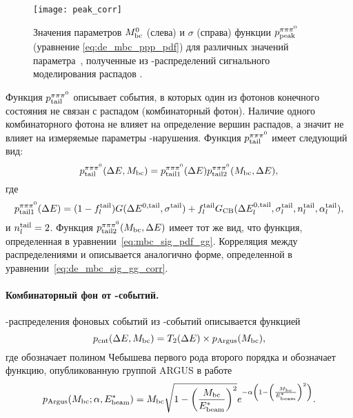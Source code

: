 \begin{figure}[htb]
 \centering
  \texttt{[image: peak\_corr]}\\
  \caption{Значения параметров $M_{\mathrm{bc}}^0$ (слева) и $\sigma$ (справа) функции $p{}_{\mathrm{peak}}^{\pi\pi\pi^0}$  (уравнение \eqref{eq:de_mbc_ppp_pdf}) для различных значений параметра~\de, полученные из \mbc-распределений сигнального моделирования распадов \bdomega.}
  \label{fig:sig_corr2}
\end{figure}

Функция $p{}_{\mathrm{tail}}^{\pi\pi\pi^0}$ описывает события, в которых один из фотонов конечного состояния не связан с распадом \brec (комбинаторный фотон).  Наличие одного комбинаторного фотона не влияет на определение вершин распадов, а значит не влияет на измеряемые параметры \cpconj-нарушения.  Функция $p{}_{\mathrm{tail}}^{\pi\pi\pi^0}$ имеет следующий вид:
\begin{equation}\label{eq:de_mbc_sig_ppp_tail}
 p{}_{\mathrm{tail}}^{\pi\pi\pi^0}(\Delta E,M_{\mathrm{bc}}) = p_{\mathrm{tail}1}^{\pi\pi\pi^0}(\Delta E)p_{\mathrm{tail}2}^{\pi\pi\pi^0}(M_{\mathrm{bc}},\Delta E),
\end{equation}
где
\begin{equation}\label{eq:de_sig_pdf_ppp_tail}
 p_{\mathrm{tail}1}^{\pi\pi\pi^0}(\Delta E) = (1-f^{\mathrm{tail}}_l)G(\Delta E^{0,\mathrm{tail}},\sigma^{\mathrm{tail}})+f^{\mathrm{tail}}_lG_{\textrm{CB}}(\Delta E^{0,\mathrm{tail}}_l,\sigma^{\mathrm{tail}}_l,n^{\mathrm{tail}}_l,\alpha^{\mathrm{tail}}_l),
\end{equation}
и $n^{\mathrm{tail}}_{l} = 2$.  Функция $p_{\mathrm{tail}2}^{\pi\pi\pi^0}(M_{\mathrm{bc}},\Delta E)$ имеет тот же вид, что функция, определенная в уравнении~\eqref{eq:mbc_sig_pdf_gg}.  Корреляция между распределениями \de и \mbc описывается аналогично форме, определенной в уравнении~\eqref{eq:de_mbc_sig_gg_corr}.

\paragraph{\boldmath Комбинаторный фон от \qqbar-событий.}
 \de-\mbc распределения фоновых событий из \qqbar-событий описывается функцией
\begin{equation}\label{eq:de-mbc-cont}
 p_{\textrm{cnt}}(\Delta E,M_{\mathrm{bc}}) = T_2(\Delta E)\times p_{\mathrm{Argus}}(M_{\mathrm{bc}}),
\end{equation}
где \cheb обозначает полином Чебышева первого рода второго порядка и \argus обозначает функцию, опубликованную группой ARGUS в работе~\cite{arguspdf}
\begin{equation}
 p_{\mathrm{Argus}}(M_{\mathrm{bc}};\alpha,E_{\textrm{beam}}^*) = M_{\mathrm{bc}}\sqrt{1-\left(\frac{M_{\mathrm{bc}}}{E_{\textrm{beam}}^*}\right)^2}e^{-\alpha\left(1-\left(\frac{M_{\mathrm{bc}}}{E_{\textrm{beam}}^*}\right)^2\right)}.
\end{equation}

